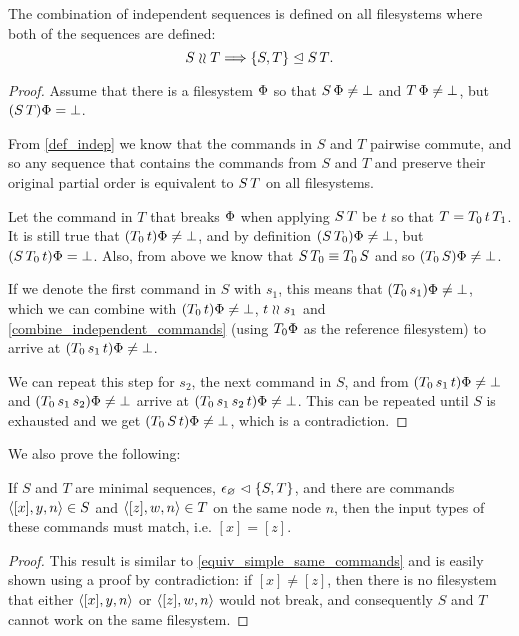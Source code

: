 \begin{mylem}
The combination of independent sequences is defined on all filesystems
where both of the sequences are defined:
\[ S\mathrel{\wr\wr} T \Longrightarrow {\{{S,T}\}}\trianglelefteq{S\,T}. \]
\end{mylem}
\begin{proof}
Assume that there is a filesystem $\Phi$ so that
$S\,\Phi\neq\bot$ and $T\,\Phi\neq\bot$, but
$(S\, T)\Phi=\bot$.

From \cref{def_indep} we know that
the commands in $S$ and $T$ pairwise commute, and so any sequence
that contains the commands from $S$ and $T$ and preserve their original partial order
is equivalent to $S\, T$ on all filesystems.

Let the command in $T$ that breaks $\Phi$ when applying $S\, T$ be $t$
so that $T=T_0\, t\, T_1$.
It is still true that $(T_0 \, t)\Phi\neq\bot$,
and by definition $(S\, T_0)\Phi\neq\bot$,
but $(S\, T_0\, t)\Phi=\bot$.
Also, from above we know that $S\, T_0\equiv T_0\, S$
and so $(T_0 \, S)\Phi\neq\bot$.

If we denote the first command in $S$ with $s_1$,
this means that $(T_0 \, s_1)\Phi\neq\bot$,
which we can combine with $(T_0 \, t)\Phi\neq\bot$, $t\mathrel{\wr\wr} s_1$ and
\cref{combine_independent_commands}
(using $T_0\Phi$ as the reference filesystem)
to arrive at $(T_0 \, s_1\, t)\Phi\neq\bot$.

We can repeat this step for $s_2$, the next command in $S$,
and from 
$(T_0 \, s_1\, t)\Phi\neq\bot$
and
$(T_0 \, s_1\, s_2)\Phi\neq\bot$
arrive at
$(T_0 \, s_1\, s_2\, t)\Phi\neq\bot$.
This can be repeated until $S$ is exhausted and we get
$(T_0 \, S\, t)\Phi\neq\bot$, which is a contradiction.
\end{proof}

We also prove the following:

\begin{mylem}
If $S$ and $T$ are minimal sequences, ${\epsilon_\varnothing}\vartriangleleft{\{{S,T}\}}$,
and there are commands $\langle{[x],y,n}\rangle\in S$ and $\langle{[z],w,n}\rangle\in T$ on the same node $n$,
then the input types of these commands must match, i.e. $[x]=[z]$.
\end{mylem}
\begin{proof}
This result is similar to \cref{equiv_simple_same_commands} and
is easily shown using a proof by contradiction: if $[x]\neq [z]$, then there is no filesystem that
either $\langle{[x],y,n}\rangle$ or $\langle{[z],w,n}\rangle$ would not break, 
and consequently $S$ and $T$ cannot work on the same filesystem.
\end{proof}

